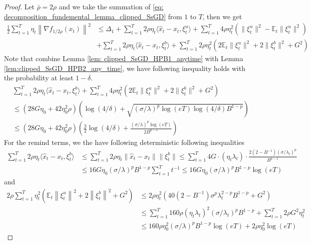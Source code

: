 \documentclass{article}
\def \E {\mathbb{E}}
\def \brho {\bar{\rho}}
\def \hx {\hat{x}}
\def \sumT {\sum_{t=1}^T}
\def \nab {\nabla}
\newcommand{\norm}[2][]{\left\|#2\right\|^{#1}}
\begin{document}
\begin{proof}
    Let $\brho=2\rho$ and we take the summation of \eqref{eq: decomposition_fundemental_lemma_clipped_SsGD} from $1$ to $T$, then we get
    \begin{align}\label{eq:summation_decomposition_fundemental_lemma_clipped_SsGD}
       \frac{1}{2}\sumT \eta_t\norm[2]{\nab f_{1/2\rho}(x_t)} &\leq \Delta_1 + \sumT 2\rho\eta_t\langle \hx_t-x_t, \xi_t^u\rangle + \sumT 4\rho\eta_t^2(\|\xi_t^u\|^2-\E_t\|\xi_t^u\|^2)\nonumber\\
        &+ \sumT2\rho\eta_t\langle \hx_t-x_t,\xi_t^b\rangle+ \sumT2\rho\eta_t^2(2\E_t\|\xi_t^u\|^2+2\|\xi_t^b\|^2+G^2)
    \end{align}
    Note that combine Lemma \ref{lem: clipped_SsGD_HPB1_anytime} with Lemma \ref{lem:clipped_SsGD_HPB2_any_time}, we have following inequality holds with the probability at least $1-\delta$.
    \begin{align}\label{eq:summation_HPB_clipped_SsGD}
        &\sumT2\rho\eta_t\langle \hx_t-x_t,\xi_t^b\rangle+ \sumT4\rho\eta_t^2(2\E_t\|\xi_t^u\|^2+2\|\xi_t^b\|^2+G^2)\nonumber\\
        &\leq (28G\eta_0+42\eta_0^2\rho)\left(\log(4/\delta) + \sqrt{(\sigma/\lambda)^p\log(eT)\log(4/\delta)B^{1-p}}\right)\nonumber\\
        &\leq (28G\eta_0+42\eta_0^2\rho)\left(\frac{3}{2}\log(4/\delta)+\frac{(\sigma/\lambda)^p\log(eT)}{2B^{p-1}}\right)
    \end{align}
    For the remind terms, we the have following deterministic following inequalities
    \begin{align}\label{eq:deterministic_summation1_clipped_SsGD}
        \sumT 2\rho\eta_t\langle\hx_t-x_t,\xi_t^b\rangle &\leq \sumT 2\rho\eta_t\|\hx_t-x_t\|\|\xi_t^b\|\leq \sumT 4G\cdot(\eta_t\lambda_t)\cdot \frac{2(2-B^{-1})(\sigma/\lambda_t)^p}{B^{p-1}}\nonumber\\
        &\leq 16G\eta_0(\sigma/\lambda)^pB^{1-p}\sumT t^{-1}\leq 16G\eta_0(\sigma/\lambda)^pB^{1-p}\log(eT)
    \end{align}
    and 
    \begin{align}\label{eq:deterministic_summation2_clipped_SsGD}
        2\rho\sumT\eta_t^2(\E_t\norm[2]{\xi_t^u}+2\norm[2]{\xi_t^b}+G^2)&\leq 2\rho\eta_t^2\left(40(2-B^{-1})\sigma^p\lambda_t^{2-p}B^{1-p}+G^2\right)\nonumber\\
        &\leq \sumT160\rho(\eta_t\lambda_t)^2(\sigma/\lambda_t)^pB^{1-p}+\sumT2\rho G^2\eta_t^2\nonumber\\
        &\leq 160\rho\eta_0^2(\sigma/\lambda)^pB^{1-p}\log(eT) + 2\rho\eta_0^2\log(eT)

\end{align}
\end{proof}
\end{document}

